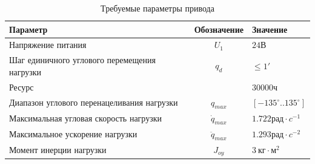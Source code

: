 \begin{table}[h!]
    \centering
    \begin{tabular}{|l|c|l|}
        \hline
        Параметр                                    & Обозначение      & Значение                           \\
        \hline
        Напряжение питания                          & $U_1$            & $24 \textit{В} $                   \\
        Шаг единичного углового перемещения нагрузки& $q_d$            & $ \le 1' $                         \\
        Ресурс                                      &                  & $30000 \textit{ч} $                \\
        Диапазон углового перенацеливания нагрузки  & $q_{max}$        & $[-135^\circ .. 135^\circ] $       \\
        Максимальная угловая скорость нагрузки      & $\dot{q}_{max}$  & $1.722 \textit{рад} \cdot \textit{c}^{-1}$ \\
        Максимальное ускорение нагрузки             & $\ddot{q}_{max}$ & $1.293 \textit{рад} \cdot \textit{c}^{-2}$ \\
        Момент инерции нагрузки                     & $J_{oy}$         & $3 ~\textit{кг} \cdot \textit{м}^2 $   \\
        \hline
    \end{tabular}
    \caption{Требуемые параметры привода}
    \label{drive_parameters_tbl}
\end{table}

\endinput
